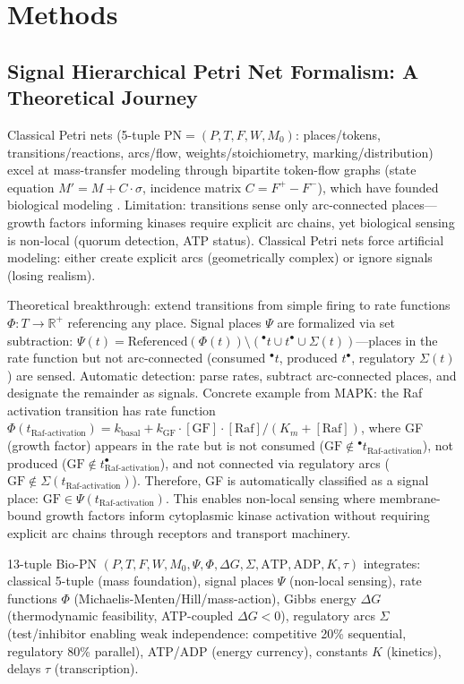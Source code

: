 \documentclass[twocolumn,11pt]{article}
\begin{document}
\section*{Methods}

\subsection*{Signal Hierarchical Petri Net Formalism: A Theoretical Journey}

Classical Petri nets (5-tuple $\text{PN} = (P, T, F, W, M_0)$: places/tokens, transitions/reactions, arcs/flow, weights/stoichiometry, marking/distribution) excel at mass-transfer modeling through bipartite token-flow graphs (state equation $M' = M + C \cdot \sigma$, incidence matrix $C = F^+ - F^-$), which have founded biological modeling \citep{chaouiya2007, heiner2008}. Limitation: transitions sense only arc-connected places—growth factors informing kinases require explicit arc chains, yet biological sensing is non-local (quorum detection, ATP status). Classical Petri nets force artificial modeling: either create explicit arcs (geometrically complex) or ignore signals (losing realism).

Theoretical breakthrough: extend transitions from simple firing to rate functions $\Phi: T \rightarrow \mathbb{R}^+$ referencing any place. Signal places $\Psi$ are formalized via set subtraction: $\Psi(t) = \text{Referenced}(\Phi(t)) \setminus ({}^\bullet t \cup t^\bullet \cup \Sigma(t))$—places in the rate function but not arc-connected (consumed ${}^\bullet t$, produced $t^\bullet$, regulatory $\Sigma(t)$) are sensed. Automatic detection: parse rates, subtract arc-connected places, and designate the remainder as signals. Concrete example from MAPK: the Raf activation transition has rate function $\Phi(t_{\text{Raf-activation}}) = k_{\text{basal}} + k_{\text{GF}} \cdot [\text{GF}] \cdot [\text{Raf}] / (K_m + [\text{Raf}])$, where GF (growth factor) appears in the rate but is not consumed ($\text{GF} \notin {}^\bullet t_{\text{Raf-activation}}$), not produced ($\text{GF} \notin t_{\text{Raf-activation}}^\bullet$), and not connected via regulatory arcs ($\text{GF} \notin \Sigma(t_{\text{Raf-activation}})$). Therefore, GF is automatically classified as a signal place: $\text{GF} \in \Psi(t_{\text{Raf-activation}})$. This enables non-local sensing where membrane-bound growth factors inform cytoplasmic kinase activation without requiring explicit arc chains through receptors and transport machinery.

13-tuple Bio-PN $(P, T, F, W, M_0, \Psi, \Phi, \Delta G, \Sigma, \text{ATP}, \text{ADP}, K, \tau)$ integrates: classical 5-tuple (mass foundation), signal places $\Psi$ (non-local sensing), rate functions $\Phi$ (Michaelis-Menten/Hill/mass-action), Gibbs energy $\Delta G$ (thermodynamic feasibility, ATP-coupled $\Delta G < 0$), regulatory arcs $\Sigma$ (test/inhibitor enabling weak independence: competitive 20\% sequential, regulatory 80\% parallel), ATP/ADP (energy currency), constants $K$ (kinetics), delays $\tau$ (transcription).
\end{document}
